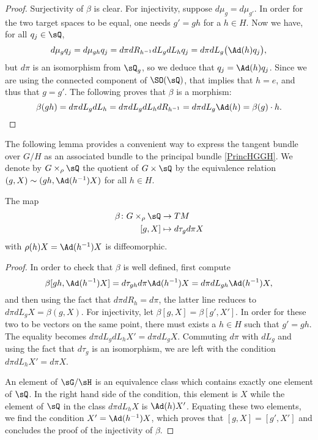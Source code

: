 \begin{proof}
Surjectivity of $\beta$ is clear. For injectivity, suppose $d\mu_g=d\mu_{g'}$. In order for the two target spaces to be equal, one needs $g'=gh$ for a $h\in H$. Now we have, for all $q_j\in\sQ$,
\begin{equation}
  d\mu_gq_j=d\mu_{gh}q_j=d\pi dR_{h^{-1}}dL_gdL_hq_j
        =d\pi dL_g\big( \Ad(h)q_j \big),
\end{equation}
but $d\pi$ is an isomorphism from $\sQ_g$, so we deduce that $q_j=\Ad(h)q_j$. Since we are using the connected component of $\SO(\sQ)$, that implies that $h=e$, and thus that $g=g'$. The following proves that $\beta$ is a morphism:
\[
  \beta(gh)=d\pi dL_g dL_h=d\pi dL_g dL_h dR_{h^{-1}}=d\pi dL_g \Ad(h)=\beta(g)\cdot h.
\]
\end{proof}

The following lemma provides  a convenient way to express the tangent bundle over $G/H$ as an associated bundle to the principal bundle \eqref{PrincHGGH}. We denote by $G\times_{\rho} \sQ$ the quotient of $G\times\sQ$ by the equivalence relation $(g,X)\sim(gh,\Ad(h^{-1})X)$ for all $h\in H$.

\begin{lemma}
The map
\begin{equation}
\begin{aligned}
 \beta\colon G\times_{\rho}\sQ&\to TM \\
[g,X]&\mapsto d\tau_gd\pi X
\end{aligned}
\end{equation}
with $\rho(h)X=\Ad(h^{-1})X$ is diffeomorphic.
\label{LemBazHGGH}
\end{lemma}

\begin{proof}

 In order to check that $\beta$ is well defined, first compute
\[
  \beta[gh,\Ad(h^{-1})X]=d\tau_{gh}d\pi\Ad(h^{-1})X=d\pi dL_{gh}\Ad(h^{-1})X,
\]
and then using the fact that $d\pi dR_h=d\pi$, the latter line reduces to $d\pi dL_gX=\beta(g,X)$. For injectivity, let $\beta[g,X]=\beta[g',X']$. In order for these two to be vectors on the same point, there must exists a $h\in H$ such that $g'=gh$. The equality becomes $d\pi dL_g dL_h X'=d\pi dL_gX$. Commuting $d\pi$ with $dL_g$ and using the fact that $d\tau_g$ is an isomorphism, we are left with the condition $d\pi dL_h X'=d\pi X$.

An element of $\sG/\sH$ is an equivalence class which contains exactly one element of $\sQ$. In the right hand side of the condition, this element is $X$ while the element of $\sQ$ in the class $d\pi dL_h X$ is $\Ad(h)X'$. Equating these two elements, we find the condition $X'=\Ad(h^{-1})X$, which proves that $[g,X]=[g',X']$ and concludes the proof of the injectivity of $\beta$.
\end{proof}

